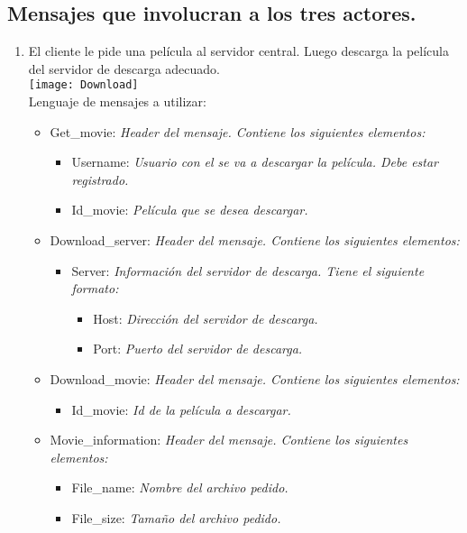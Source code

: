 \documentclass{article}
\begin{document}
\subsection*{Mensajes que involucran a los tres actores.}

\begin{enumerate}
    \item El cliente le pide una película al servidor central. Luego descarga la película del servidor de descarga adecuado.\\[0.4cm]
    \texttt{[image: Download]}\\[0.4cm]
    Lenguaje de mensajes a utilizar:
    \begin{itemize}
        \item Get\_movie:    \emph{Header del mensaje. Contiene los siguientes elementos:}
        \begin{itemize}
            \item Username:    \emph{Usuario con el se va a descargar la película. Debe estar registrado.}
            \item Id\_movie:    \emph{Película que se desea descargar.}
        \end{itemize}
        \item Download\_server:    \emph{Header del mensaje. Contiene los siguientes elementos:}
        \begin{itemize}
            \item Server:    \emph{Información del servidor de descarga. Tiene el siguiente formato:}
            \begin{itemize}
                \item Host:    \emph{Dirección del servidor de descarga.}
                \item Port:    \emph{Puerto del servidor de descarga.}
            \end{itemize}
        \end{itemize}
        \item Download\_movie:    \emph{Header del mensaje. Contiene los siguientes elementos:}
        \begin{itemize}
            \item Id\_movie:    \emph{Id de la película a descargar.}   
        \end{itemize}
        \item Movie\_information:    \emph{Header del mensaje. Contiene los siguientes elementos:}
        \begin{itemize}
            \item File\_name:    \emph{Nombre del archivo pedido.}   
            \item File\_size:    \emph{Tamaño del archivo pedido.}   
        \end{itemize}
    \end{itemize}
\end{enumerate}
\end{document}
